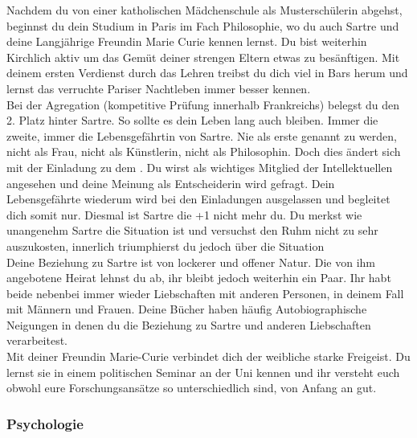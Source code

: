 \documentclass[12pt, a4paper, openany]{report}
\begin{document}
Nachdem du von einer katholischen Mädchenschule als Musterschülerin abgehst, beginnst du dein Studium in Paris im Fach Philosophie, wo du auch Sartre und deine Langjährige Freundin Marie Curie kennen lernst. Du bist weiterhin Kirchlich aktiv um das Gemüt deiner strengen Eltern etwas zu besänftigen. Mit deinem ersten Verdienst durch das Lehren treibst du dich viel in Bars herum und lernst das verruchte Pariser Nachtleben immer besser kennen. \\

Bei der Agregation (kompetitive Prüfung innerhalb Frankreichs) belegst du den 2. Platz hinter Sartre. So sollte es dein Leben lang auch bleiben. Immer die zweite, immer die Lebensgefährtin von Sartre. Nie als erste genannt zu werden, nicht als Frau, nicht als Künstlerin, nicht als Philosophin. Doch dies ändert sich mit der Einladung zu dem . Du wirst als wichtiges Mitglied der Intellektuellen angesehen und deine Meinung als Entscheiderin wird gefragt. Dein Lebensgefährte wiederum wird bei den Einladungen ausgelassen und begleitet dich somit nur. Diesmal ist Sartre die +1 nicht mehr du. Du merkst wie unangenehm Sartre die Situation ist und versuchst den Ruhm nicht zu sehr auszukosten, innerlich triumphierst du jedoch über die Situation \\

Deine Beziehung zu Sartre ist von lockerer und offener Natur. Die von ihm angebotene Heirat lehnst du ab, ihr bleibt jedoch weiterhin ein Paar. Ihr habt beide nebenbei immer wieder Liebschaften mit anderen Personen, in deinem Fall mit Männern und Frauen. Deine Bücher haben häufig Autobiographische Neigungen in denen du die Beziehung zu Sartre und anderen Liebschaften verarbeitest. \\

Mit deiner Freundin Marie-Curie verbindet dich der weibliche starke Freigeist. Du lernst sie in einem politischen Seminar an der Uni kennen und ihr versteht euch obwohl eure Forschungsansätze so unterschiedlich sind, von Anfang an gut.  



\subsubsection{Psychologie}
\end{document}
